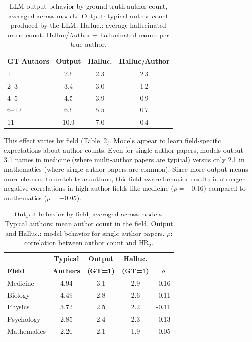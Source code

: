 \documentclass[11pt]{article}
\begin{document}
\begin{table}[htbp]
\centering
\small

\begin{tabular}{lccc}
\toprule
\textbf{GT Authors} & \textbf{Output} & \textbf{Halluc.} & \textbf{Halluc/Author} \\
\midrule
1      & 2.5 & 2.3 & 2.3 \\
2--3   & 3.4 & 3.0 & 1.2 \\
4--5   & 4.5 & 3.9 & 0.9 \\
6--10  & 6.5 & 5.5 & 0.7 \\
11+    & 10.0 & 7.0 & 0.4 \\
\bottomrule
\end{tabular}
\caption{LLM output behavior by ground truth author count, averaged across models. Output: typical author count produced by the LLM. Halluc.: average hallucinated name count. Halluc/Author = hallucinated names per true author.}
\label{tab:author_output}
\end{table}

This effect varies by field (Table~\ref{tab:field_author}). Models appear to learn field-specific expectations about author counts. Even for single-author papers, models output 3.1 names in medicine (where multi-author papers are typical) versus only 2.1 in mathematics (where single-author papers are common). Since more output means more chances to match true authors, this field-aware behavior results in stronger negative correlations in high-author fields like medicine ($\rho = -0.16$) compared to mathematics ($\rho = -0.05$).

\begin{table}[htbp]
\centering
\small

\begin{tabular}{lcccc}
\toprule
 & \textbf{Typical} & \textbf{Output} & \textbf{Halluc.} & \\
\textbf{Field} & \textbf{Authors} & \textbf{(GT=1)} & \textbf{(GT=1)} & \textbf{$\rho$} \\
\midrule
Medicine      & 4.94 & 3.1 & 2.9 & -0.16 \\
Biology       & 4.49 & 2.8 & 2.6 & -0.11 \\
Physics       & 3.72 & 2.5 & 2.2 & -0.11 \\
Psychology    & 2.85 & 2.4 & 2.3 & -0.13 \\
Mathematics   & 2.20 & 2.1 & 1.9 & -0.05 \\
\bottomrule
\end{tabular}
\caption{Output behavior by field, averaged across models. Typical authors: mean author count in the field. Output and Halluc.: model behavior for single-author papers. $\rho$: correlation between author count and HR$_2$.}
\label{tab:field_author}
\end{table}
\end{document}
